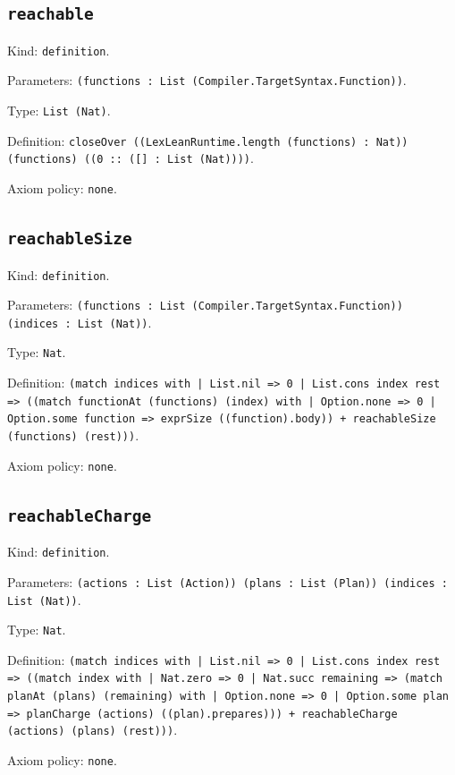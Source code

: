 \documentclass[11pt]{article}
\begin{document}
\subsection*{\texttt{reachable}}
\noindent Kind: \texttt{definition}.\par
\noindent Parameters: \texttt{(functions : List (Compiler.TargetSyntax.Function))}.\par
\noindent Type: \texttt{List (Nat)}.\par
\noindent Definition: \texttt{closeOver ((LexLeanRuntime.length (functions) : Nat)) (functions) ((0 :: ([] : List (Nat))))}.\par
\noindent Axiom policy: \texttt{none}.\par
\subsection*{\texttt{reachableSize}}
\noindent Kind: \texttt{definition}.\par
\noindent Parameters: \texttt{(functions : List (Compiler.TargetSyntax.Function)) (indices : List (Nat))}.\par
\noindent Type: \texttt{Nat}.\par
\noindent Definition: \texttt{(match indices with | List.nil => 0 | List.cons index rest => ((match functionAt (functions) (index) with | Option.none => 0 | Option.some function => exprSize ((function).body)) + reachableSize (functions) (rest)))}.\par
\noindent Axiom policy: \texttt{none}.\par
\subsection*{\texttt{reachableCharge}}
\noindent Kind: \texttt{definition}.\par
\noindent Parameters: \texttt{(actions : List (Action)) (plans : List (Plan)) (indices : List (Nat))}.\par
\noindent Type: \texttt{Nat}.\par
\noindent Definition: \texttt{(match indices with | List.nil => 0 | List.cons index rest => ((match index with | Nat.zero => 0 | Nat.succ remaining => (match planAt (plans) (remaining) with | Option.none => 0 | Option.some plan => planCharge (actions) ((plan).prepares))) + reachableCharge (actions) (plans) (rest)))}.\par
\noindent Axiom policy: \texttt{none}.\par
\end{document}
